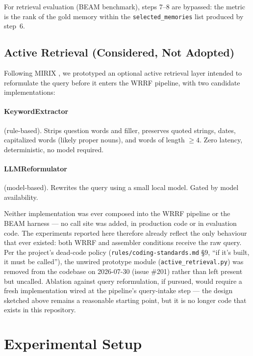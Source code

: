 \documentclass[11pt]{article}
\begin{document}
For retrieval evaluation (BEAM benchmark), steps 7--8 are bypassed:
the metric is the rank of the gold memory within the
\texttt{selected\_memories} list produced by step~6.

\subsection{Active Retrieval (Considered, Not Adopted)}
\label{sec:active-retrieval}

Following MIRIX \citep{Wang2025}, we prototyped an optional active
retrieval layer intended to reformulate the query before it enters
the WRRF pipeline, with two candidate implementations:

\paragraph{KeywordExtractor} (rule-based).
Strips question words and filler, preserves quoted strings, dates,
capitalized words (likely proper nouns), and words of length $\geq 4$.
Zero latency, deterministic, no model required.

\paragraph{LLMReformulator} (model-based).
Rewrites the query using a small local model.  Gated by model
availability.

Neither implementation was ever composed into the WRRF pipeline or
the BEAM harness --- no call site was added, in production code or in
evaluation code. The experiments reported here therefore already
reflect the only behaviour that ever existed: both WRRF and assembler
conditions receive the raw query. Per the project's dead-code policy
(\texttt{rules/coding-standards.md} \S9, ``if it's built, it must be
called''), the unwired prototype module (\texttt{active\_retrieval.py})
was removed from the codebase on 2026-07-30 (issue \#201) rather than
left present but uncalled. Ablation against query reformulation, if
pursued, would require a fresh implementation wired at the pipeline's
query-intake step --- the design sketched above remains a reasonable
starting point, but it is no longer code that exists in this
repository.

\section{Experimental Setup}
\label{sec:experiments}
\end{document}
